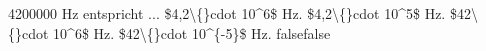     {4200000 Hz entspricht ...}
    {\$4,2\textbackslash\{\}cdot 10\textasciicircum{}6\$ Hz.}
    {\$4,2\textbackslash\{\}cdot 10\textasciicircum{}5\$ Hz.}
    {\$42\textbackslash\{\}cdot 10\textasciicircum{}6\$ Hz.}
    {\$42\textbackslash\{\}cdot 10\textasciicircum{}\{-5\}\$ Hz.}
    {false}{false}